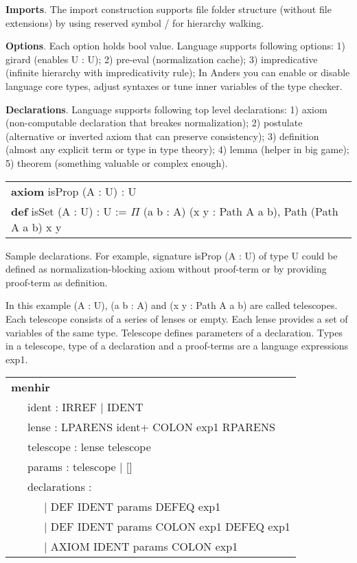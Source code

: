 \documentclass[a4paper,UKenglish,cleveref, autoref, thm-restate]{lipics-v2021}
\newcommand{\tabstyle}[0]{\scriptsize\ttfamily\fontseries{l}\selectfont}
\begin{document}
\textbf{Imports}. The import construction supports file folder structure (without file extensions)
by using reserved symbol / for hierarchy walking.

\textbf{Options}. Each option holds bool value. Language supports following options:
1) girard (enables U : U);
2) pre-eval (normalization cache);
3) impredicative (infinite hierarchy with impredicativity rule);
In Anders you can enable or disable language core types, adjust syntaxes or
tune inner variables of the type checker.

\textbf{Declarations}. Language supports following top level declarations:
1) axiom (non-computable declaration that breakes normalization);
2) postulate (alternative or inverted axiom that can preserve consistency);
3) definition (almost any explicit term or type in type theory);
4) lemma (helper in big game);
5) theorem (something valuable or complex enough).

\begin{table}[ht!]
\tabstyle
\begin{tabular}{l}
\textbf{axiom} isProp (A : U) : U \\
\textbf{def} isSet (A : U) : U := \textbf{$\Pi$} (a b : A) (x y : Path A a b), Path (Path A a b) x y
\end{tabular}
\end{table}

Sample declarations. For example, signature isProp (A : U) of type U could be
defined as normalization-blocking axiom without proof-term or by providing proof-term as definition.

In this example (A : U), (a b : A) and (x y : Path A a b) are called telescopes.
Each telescope consists of a series of lenses or empty. Each lense provides a
set of variables of the same type. Telescope defines parameters of a declaration.
Types in a telescope, type of a declaration and a proof-terms are a language expressions exp1.

\begin{table}[ht]
\tabstyle
\begin{tabular}{l}
\textbf{menhir} \\
\ \ \ ident : IRREF | IDENT \\
\ \ \ lense : LPARENS ident+ COLON exp1 RPARENS \\
\ \ \ telescope : lense telescope \\
\ \ \ params : telescope | [] \\
\ \ \ declarations : \\
\ \ \ \ \ \ | DEF IDENT params DEFEQ exp1 \\
\ \ \ \ \ \ | DEF IDENT params COLON exp1 DEFEQ exp1 \\
\ \ \ \ \ \ | AXIOM IDENT params COLON exp1
\end{tabular}
\end{table}
\end{document}
